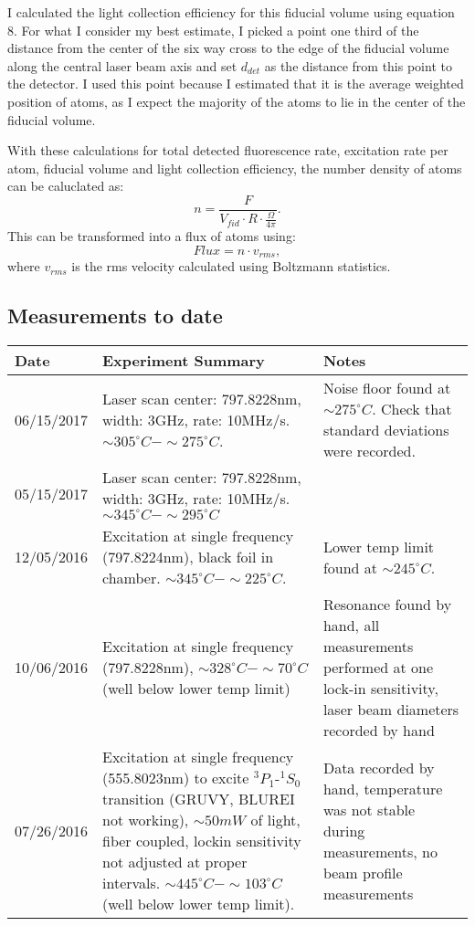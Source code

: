 \documentclass[12pt, a4paper]{article}
\begin{document}
I calculated the light collection efficiency for this fiducial volume using equation 8. For what I consider my best estimate, I picked a point one third of the distance from the center of the six way cross to the edge of the fiducial volume along the central laser beam axis and set $d_{det}$ as the distance from this point to the detector. I used this point because I estimated that it is the average weighted position of atoms, as I expect the majority of the atoms to lie in the center of the fiducial volume.

With these calculations for total detected fluorescence rate, excitation rate per atom, fiducial volume and light collection efficiency, the number density of atoms can be caluclated as:
\begin{equation}
n = \frac{F}{V_{fid}\cdot R \cdot \frac{\Omega}{4\pi} }.
\end{equation}
This can be transformed into a flux of atoms using:
\begin{equation}
Flux = n\cdot v_{rms},
\end{equation}
where $v_{rms}$ is the rms velocity calculated using Boltzmann statistics.


\subsection{Measurements to date}
\begin{center}
\begin{table}[!h]
\begin{tabular}{||p{2cm}|p{8cm}|p{5cm}||}
\hline
Date & Experiment Summary & Notes\\
\hline\hline
06/15/2017 & Laser scan center: 797.8228nm, width: 3GHz, rate: 10MHz/s. $\sim305^{\circ}C-\sim275^{\circ}C$. &  Noise floor found at $\sim275^{\circ}C$. Check that standard deviations were recorded.\\
\hline
05/15/2017 & Laser scan center: 797.8228nm, width: 3GHz, rate: 10MHz/s. $\sim345^{\circ}C-\sim295^{\circ}C$ & \\
\hline 
12/05/2016 & Excitation at single frequency (797.8224nm), black foil in chamber. $\sim345^{\circ}C-\sim225^{\circ}C$. &  Lower temp limit found at $\sim245^{\circ}C$. \\
\hline
10/06/2016 & Excitation at single frequency (797.8228nm), $\sim328^{\circ}C-\sim70^{\circ}C$ (well below lower temp limit) & Resonance found by hand, all measurements performed at one lock-in sensitivity, laser beam diameters recorded by hand\\
\hline
07/26/2016 & Excitation at single frequency (555.8023nm) to excite $^{3}P_{1}$-$ ^{1}S_{0}$ transition (GRUVY, BLUREI not working), $\sim50mW$ of light, fiber coupled, lockin sensitivity not adjusted at proper intervals. $\sim445^{\circ}C-\sim103^{\circ}C$ (well below lower temp limit). & Data recorded by hand, temperature was not stable during measurements, no beam profile measurements\\
\hline
\end{tabular}
\end{table}
\end{center}
\end{document}
